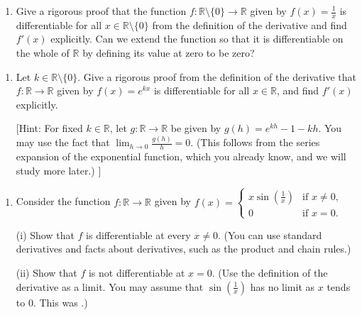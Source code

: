\documentclass[letterpaper,10pt,english]{jupyterBook}
\begin{document}
\label{\detokenize{Problems:id39}}\begin{enumerate}
%
\setcounter{enumi}{38}
\item {} 
\sphinxAtStartPar
Give a rigorous proof that the function \(f:\mathbb{R}\setminus\{0\}\to \mathbb{R}\) given by
\(f(x) = \frac{1}{x}\) is differentiable for all \(x \in \mathbb{R} \setminus \{0\}\) from the definition of the derivative and find \(f'(x)\) explicitly. Can we extend the function so that it is differentiable on the whole of \(\mathbb{R}\) by defining its value at zero to be zero?

\end{enumerate}
\label{\detokenize{Problems:id40}}\begin{enumerate}
%
\setcounter{enumi}{39}
\item {} 
\sphinxAtStartPar
Let \(k\in \mathbb{R}\setminus\{0\}\). Give a rigorous proof from the definition of the derivative that  \(f:\mathbb{R}\to \mathbb{R}\) given by  \(f(x) = e^{kx}\) is differentiable for all \(x \in \mathbb{R}\), and find \(f'(x)\) explicitly.

{[}Hint: For fixed \(k\in \mathbb{R}\), let \(g:\mathbb{R}\to\mathbb{R}\) be given by \(g(h)=e^{kh} - 1 - kh \).
You may use the fact that  \(\displaystyle\lim_{h \rightarrow 0}\frac{g(h)}{h} = 0\). (This follows from the series expansion of the exponential function, which you already know, and we will study more later.) {]}

\end{enumerate}
\label{\detokenize{Problems:id41}}\begin{enumerate}
%
\setcounter{enumi}{40}
\item {} 
\sphinxAtStartPar
{} Consider the function  \(f:\mathbb{R}\to \mathbb{R}\) given by \(f(x) = \begin{cases} x\sin\left(\frac{1}{x}\right) & \text{if }x \neq 0,\\ 0 & \text{if }x = 0.\end{cases}\)

\sphinxAtStartPar
(i) Show that \(f\) is differentiable at every \(x \neq 0\). (You can use standard derivatives and facts about derivatives, such as the product and chain rules.)

\sphinxAtStartPar
(ii) Show that \(f\) is not differentiable at \(x = 0\). (Use the definition of the derivative as a limit. You may assume that \(\sin\left(\frac{1}{x}\right)\) has no limit as \(x\) tends to \(0\). This was {\hyperref[\detokenize{Problems:id8}]{}}.)

\end{enumerate}
\end{document}
